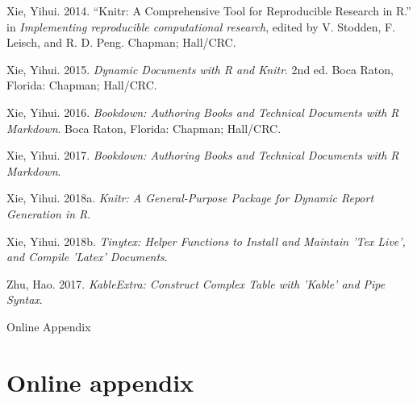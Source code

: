 \documentclass[
  12pt,
]{article}
\begin{document}
\leavevmode\hypertarget{ref-knitr3}{}%
Xie, Yihui. 2014. ``Knitr: A Comprehensive Tool for Reproducible Research in R.'' in \emph{Implementing reproducible computational research}, edited by V. Stodden, F. Leisch, and R. D. Peng. Chapman; Hall/CRC.

\leavevmode\hypertarget{ref-knitr2}{}%
Xie, Yihui. 2015. \emph{Dynamic Documents with R and Knitr}. 2nd ed. Boca Raton, Florida: Chapman; Hall/CRC.

\leavevmode\hypertarget{ref-bookdown2}{}%
Xie, Yihui. 2016. \emph{Bookdown: Authoring Books and Technical Documents with R Markdown}. Boca Raton, Florida: Chapman; Hall/CRC.

\leavevmode\hypertarget{ref-bookdown1}{}%
Xie, Yihui. 2017. \emph{Bookdown: Authoring Books and Technical Documents with R Markdown}.

\leavevmode\hypertarget{ref-knitr1}{}%
Xie, Yihui. 2018a. \emph{Knitr: A General-Purpose Package for Dynamic Report Generation in R}.

\leavevmode\hypertarget{ref-tinytex}{}%
Xie, Yihui. 2018b. \emph{Tinytex: Helper Functions to Install and Maintain 'Tex Live', and Compile 'Latex' Documents}.

\leavevmode\hypertarget{ref-kableextra}{}%
Zhu, Hao. 2017. \emph{KableExtra: Construct Complex Table with 'Kable' and Pipe Syntax}.

\clearpage

\appendix
{}

\renewcommand{\thesection}{A}

\setcounter{page}{1}

\setcounter{table}{0}
\renewcommand{\thetable}{A\arabic{table}}
\renewcommand{\figurename}{Table}

\setcounter{figure}{0}
\renewcommand\thefigure{A\arabic{figure}}
\renewcommand{\figurename}{Figure}

\clearpage
{}

\vspace*{7cm}

\begin{center}
\begin{huge}
Online Appendix
\end{huge}
\end{center}
\vspace{3cm}

\clearpage
{}

\hypertarget{online-appendix}{%
\section{Online appendix}\label{online-appendix}}
\end{document}

